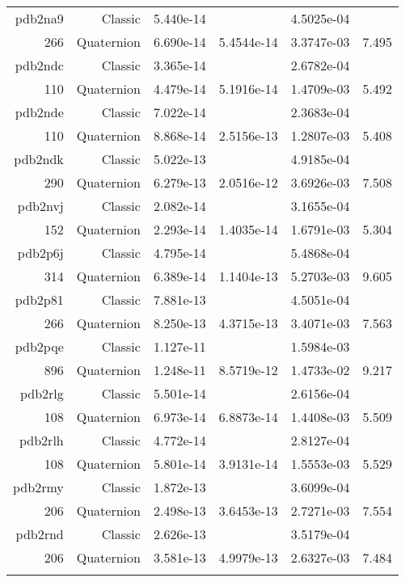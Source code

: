 \begin{xltabular}{\textwidth}{r|rS[table-format=1.3e+2]S[table-format=1.4e+2]S[table-format=1.4e+2]S[table-format=-1.3]}
pdb2na9 & Classic & 5.440e-14 &  & 4.5025e-04 & \\
266 & Quaternion & 6.690e-14 & 5.4544e-14 & 3.3747e-03 & 7.495\\  \addlinespace
pdb2ndc & Classic & 3.365e-14 &  & 2.6782e-04 & \\
110 & Quaternion & 4.479e-14 & 5.1916e-14 & 1.4709e-03 & 5.492\\  \addlinespace
pdb2nde & Classic & 7.022e-14 &  & 2.3683e-04 & \\
110 & Quaternion & 8.868e-14 & 2.5156e-13 & 1.2807e-03 & 5.408\\  \addlinespace
pdb2ndk & Classic & 5.022e-13 &  & 4.9185e-04 & \\
290 & Quaternion & 6.279e-13 & 2.0516e-12 & 3.6926e-03 & 7.508\\  \addlinespace
pdb2nvj & Classic & 2.082e-14 &  & 3.1655e-04 & \\
152 & Quaternion & 2.293e-14 & 1.4035e-14 & 1.6791e-03 & 5.304\\  \addlinespace
pdb2p6j & Classic & 4.795e-14 &  & 5.4868e-04 & \\
314 & Quaternion & 6.389e-14 & 1.1404e-13 & 5.2703e-03 & 9.605\\  \addlinespace
pdb2p81 & Classic & 7.881e-13 &  & 4.5051e-04 & \\
266 & Quaternion & 8.250e-13 & 4.3715e-13 & 3.4071e-03 & 7.563\\  \addlinespace
pdb2pqe & Classic & 1.127e-11 &  & 1.5984e-03 & \\
896 & Quaternion & 1.248e-11 & 8.5719e-12 & 1.4733e-02 & 9.217\\  \addlinespace
pdb2rlg & Classic & 5.501e-14 &  & 2.6156e-04 & \\
108 & Quaternion & 6.973e-14 & 6.8873e-14 & 1.4408e-03 & 5.509\\  \addlinespace
pdb2rlh & Classic & 4.772e-14 &  & 2.8127e-04 & \\
108 & Quaternion & 5.801e-14 & 3.9131e-14 & 1.5553e-03 & 5.529\\  \addlinespace
pdb2rmy & Classic & 1.872e-13 &  & 3.6099e-04 & \\
206 & Quaternion & 2.498e-13 & 3.6453e-13 & 2.7271e-03 & 7.554\\  \addlinespace
pdb2rnd & Classic & 2.626e-13 &  & 3.5179e-04 & \\
206 & Quaternion & 3.581e-13 & 4.9979e-13 & 2.6327e-03 & 7.484\\  \addlinespace

\end{xltabular}
